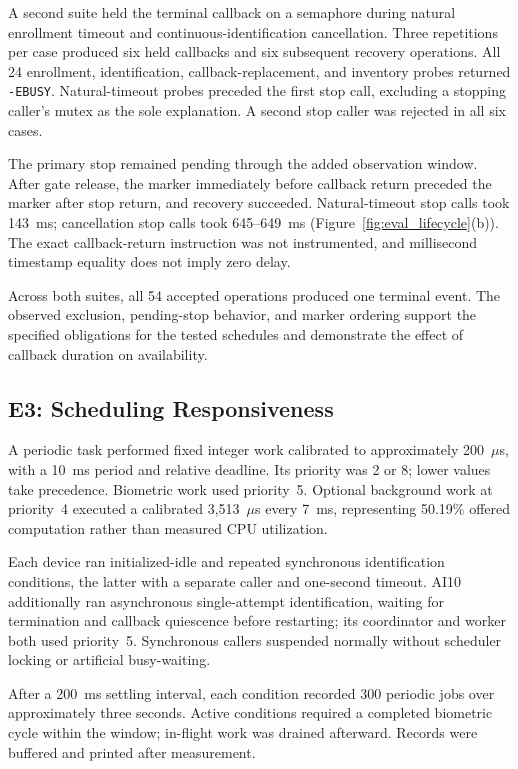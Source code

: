 A second suite held the terminal callback on a semaphore during natural enrollment timeout and continuous-identification cancellation. Three repetitions per case produced six held callbacks and six subsequent recovery operations. All 24 enrollment, identification, callback-replacement, and inventory probes returned \texttt{-EBUSY}. Natural-timeout probes preceded the first stop call, excluding a stopping caller's mutex as the sole explanation. A second stop caller was rejected in all six cases.

The primary stop remained pending through the added observation window. After gate release, the marker immediately before callback return preceded the marker after stop return, and recovery succeeded. Natural-timeout stop calls took 143~ms; cancellation stop calls took 645--649~ms (Figure~\ref{fig:eval_lifecycle}(b)). The exact callback-return instruction was not instrumented, and millisecond timestamp equality does not imply zero delay.

Across both suites, all 54 accepted operations produced one terminal event. The observed exclusion, pending-stop behavior, and marker ordering support the specified obligations for the tested schedules and demonstrate the effect of callback duration on availability.

\subsection{E3: Scheduling Responsiveness}
\label{sec:eval_scheduling}

A periodic task performed fixed integer work calibrated to approximately 200~$\mu$s, with a 10~ms period and relative deadline. Its priority was 2 or 8; lower values take precedence. Biometric work used priority~5. Optional background work at priority~4 executed a calibrated 3,513~$\mu$s every 7~ms, representing 50.19\% offered computation rather than measured CPU utilization.

Each device ran initialized-idle and repeated synchronous identification conditions, the latter with a separate caller and one-second timeout. AI10 additionally ran asynchronous single-attempt identification, waiting for termination and callback quiescence before restarting; its coordinator and worker both used priority~5. Synchronous callers suspended normally without scheduler locking or artificial busy-waiting.

After a 200~ms settling interval, each condition recorded 300 periodic jobs over approximately three seconds. Active conditions required a completed biometric cycle within the window; in-flight work was drained afterward. Records were buffered and printed after measurement.

